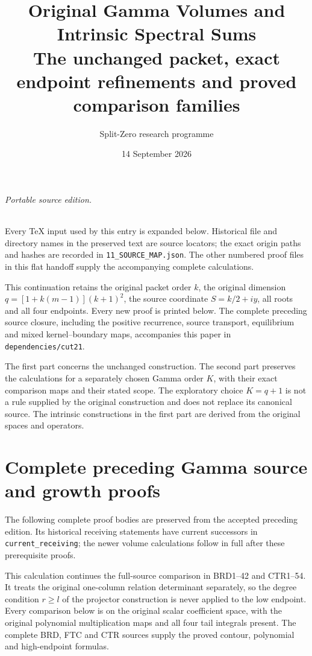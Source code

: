 \documentclass[11pt,a4paper]{article}
\title{Original Gamma Volumes and Intrinsic Spectral Sums\\[3pt]
\large The unchanged packet, exact endpoint refinements and proved comparison families}
\author{Split-Zero research programme}
\date{14 September 2026}
\begin{document}
\maketitle
\paragraph{Portable source edition.}
Every TeX input used by this entry is expanded below. Historical file
and directory names in the preserved text are source locators; the
exact origin paths and hashes are recorded in \texttt{11\_SOURCE\_MAP.json}.
The other numbered proof files in this flat handoff supply the
accompanying complete calculations.\par

This continuation retains the original packet order $k$, the original
dimension $q=[1+k(m-1)](k+1)^2$, the source coordinate $S=k/2+iy$,
all roots and all four endpoints. Every new proof is printed below.
The complete preceding source closure, including the positive recurrence,
source transport, equilibrium and mixed kernel--boundary maps, accompanies
this paper in \texttt{dependencies/cut21}.

The first part concerns the unchanged construction. The second part
preserves the calculations for a separately chosen Gamma order $K$,
with their exact comparison maps and their stated scope. The exploratory
choice $K=q+1$ is not a rule supplied by the original construction and
does not replace its canonical source. The intrinsic constructions in
the first part are derived from the original spaces and operators.

\tableofcontents
\clearpage

\part*{Complete preceding Gamma source and growth proofs}
The following complete proof bodies are preserved from the accepted
preceding edition. Its historical receiving statements have current
successors in \texttt{current\_receiving}; the newer volume calculations
follow in full after these prerequisite proofs.




This calculation continues the full-source comparison in BRD1--42 and
CTR1--54. It treats the original one-column relation determinant separately,
so the degree condition \(r\ge l\) of the projector construction is never
applied to the low endpoint. Every comparison below is on the original
scalar coefficient space, with the original polynomial multiplication
maps and all four tail integrals present. The complete BRD, FTC and CTR
sources supply the proved contour, polynomial and high-endpoint formulas.
\end{document}
